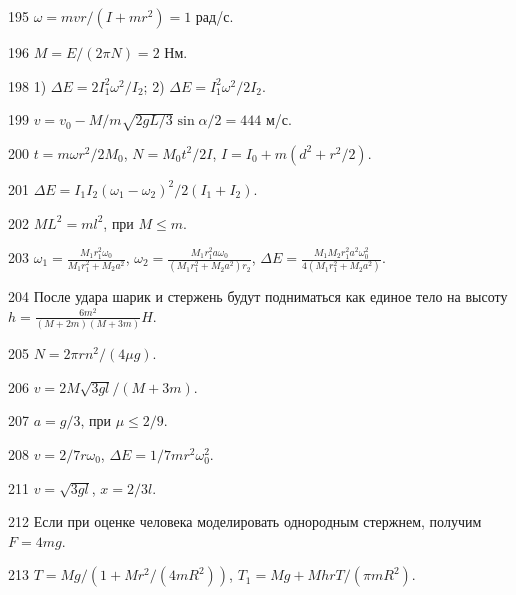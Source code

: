 \begin{Answer}{195}
$\omega = mvr/(I+mr^2) = 1$ рад/с.
\end{Answer}
\begin{Answer}{196}
$M = E / (2 \pi N) = 2$ Нм.
\end{Answer}
\begin{Answer}{198}
1) $\Delta E = 2I_1^2\omega^2/I_2$; 2) $\Delta E = I_1^2\omega^2/2I_2$.
\end{Answer}
\begin{Answer}{199}
$v = v_0 -M/m \sqrt{2gL/3} \sin \alpha /2 = 444$ м/с.
\end{Answer}
\begin{Answer}{200}
$t = m\omega r^2 / 2M_0$, $N = M_0t^2/2I$, $I = I_0 + m(d^2 + r^2/2)$.
\end{Answer}
\begin{Answer}{201}
$\Delta E = I_1 I_2 (\omega_1 - \omega_2)^2/ 2(I_1 + I_2)$.
\end{Answer}
\begin{Answer}{202}
$ML^2 = ml^2$, при $M \leq m$.
\end{Answer}
\begin{Answer}{203}
$\omega_1 = \frac{M_1r_1^2\omega_0}{M_1r_1^2 + M_2a^2}$, $\omega_2 = \frac{M_1r_1^2 a \omega_0}{(M_1r_1^2 + M_2a^2)r_2}$, $\Delta E = \frac{M_1 M_2r_1^2a^2\omega_0^2}{4(M_1r_1^2 + M_2a^2)}$.
\end{Answer}
\begin{Answer}{204}
После удара шарик и стержень будут подниматься как единое тело на высоту $h = \frac{6m^2}{(M+2m)(M+3m)}H$.
\end{Answer}
\begin{Answer}{205}
$N = 2\pi r n^2/(4 \mu g)$.
\end{Answer}
\begin{Answer}{206}
$v = 2M\sqrt{3gl}/(M+3m)$.
\end{Answer}
\begin{Answer}{207}
$a = g/3$, при $\mu \leq 2/9$.
\end{Answer}
\begin{Answer}{208}
$v = 2/7r \omega_0$, $\Delta E = 1/7 mr^2 \omega_0^2$.
\end{Answer}
\begin{Answer}{211}
$v = \sqrt{3gl}$, $x = 2/3l$.
\end{Answer}
\begin{Answer}{212}
Если при оценке человека моделировать однородным стержнем, получим $F = 4mg$.
\end{Answer}
\begin{Answer}{213}
$T = Mg/(1 + Mr^2/(4mR^2))$, $T_1 = Mg + MhrT/(\pi m R^2)$.
\end{Answer}
